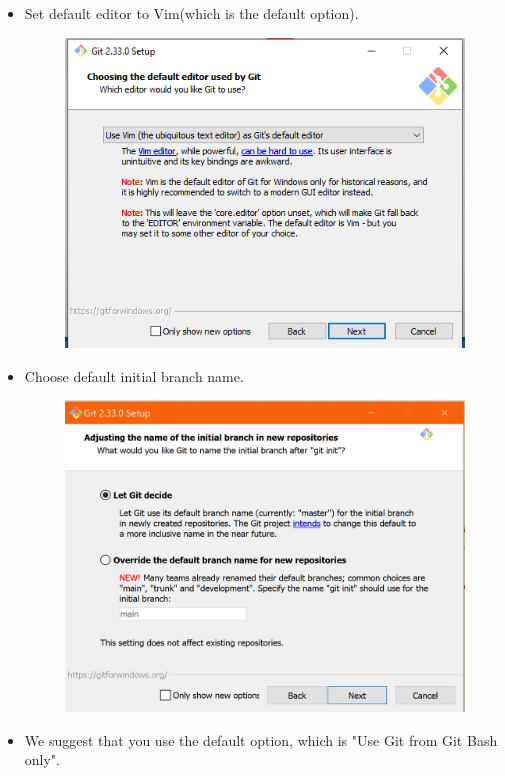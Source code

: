 \documentclass[10pt]{article} %
\begin{document}
\begin{itemize}
  \item Set default editor to Vim(which is the default option).

  \begin{figure}[h!]
    \centering
    \includegraphics[width=0.65\linewidth]{figs/git1}
    \caption{}
    \label{fig:gitbash4}
  \end{figure}

  \item Choose default initial branch name.

  \begin{figure}[h!]
    \centering
    \includegraphics[width=0.7\linewidth]{figs/GitBash14_master}
    \caption{}
    \label{fig:gitbash14_master}
  \end{figure}

  \pagebreak

  \item We suggest that you use the default option, which is "Use Git from Git Bash only".


\end{itemize}
\end{document}
